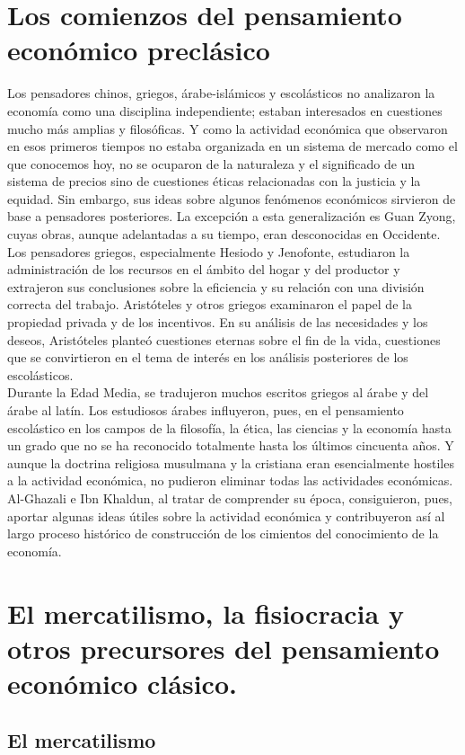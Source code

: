 \documentclass[10pt]{book}
\begin{document}
\chapter{Los comienzos del pensamiento económico preclásico}
Los pensadores chinos, griegos, árabe-islámicos y escolásticos no analizaron la economía como una disciplina independiente; estaban interesados en cuestiones mucho más amplias y filosóficas. Y como la actividad económica que observaron en esos primeros tiempos no estaba organizada en un sistema de mercado como el que conocemos hoy, no se ocuparon de la naturaleza y el significado de un sistema de precios sino de cuestiones éticas relacionadas con la justicia y la equidad. Sin embargo, sus ideas sobre algunos fenómenos económicos sirvieron de base a pensadores posteriores. La excepción a esta generalización es Guan Zyong, cuyas obras, aunque adelantadas a su tiempo, eran desconocidas en Occidente.\\
Los pensadores griegos, especialmente Hesiodo y Jenofonte, estudiaron la administración de los recursos en el ámbito del hogar y del productor y extrajeron sus conclusiones sobre la eficiencia y su relación con una división correcta del trabajo. Aristóteles y otros griegos examinaron el papel de la propiedad privada y de los incentivos. En su análisis de las necesidades y los deseos, Aristóteles planteó cuestiones eternas sobre el fin de la vida, cuestiones que se convirtieron en el tema de interés en los análisis posteriores de los escolásticos.\\
Durante la Edad Media, se tradujeron muchos escritos griegos al árabe y del árabe al latín. Los estudiosos árabes influyeron, pues, en el pensamiento escolástico en los campos de la filosofía, la ética, las ciencias y la economía hasta un grado que no se ha reconocido totalmente hasta los últimos cincuenta años. Y aunque la doctrina religiosa musulmana y la cristiana eran esencialmente hostiles a la actividad económica, no pudieron eliminar todas las actividades económicas. Al-Ghazali e Ibn Khaldun, al tratar de comprender su época, consiguieron, pues, aportar algunas ideas útiles sobre la actividad económica y contribuyeron así al largo proceso histórico de construcción de
los cimientos del conocimiento de la economía.

\chapter{El mercatilismo, la fisiocracia y otros precursores del pensamiento económico clásico.}
\section*{El mercatilismo}
\end{document}
